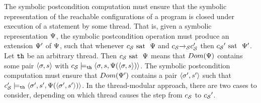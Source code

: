 The symbolic postcondition computation must ensure that the symbolic
representation
of the reachable configurations of a program is closed under execution of a
statement by some thread. That is,
given a symbolic representation $\Psi$,
the symbolic postcondition operation must produce an extension $\Psi'$
of $\Psi$, such that whenever $c_{\mathcal S} \mbox{ sat \ } \Psi$
and $c_{\mathcal S}{\xrightarrow{}{}}_{\!\!{\mathcal S}}c_{\mathcal S}'$ then
${c_{\mathcal S}}' \mbox{ sat \ } \Psi'$.
Let ${\tt th}$ be an arbitrary thread. Then $c_{\mathcal S} \mbox{ sat \ } \Psi$
means that $Dom(\Psi)$ contains some
pair $\left\langle\sigma,s\right\rangle$ with
$c_{\mathcal S} \models_{{\tt th}} \left\langle\sigma,s,\Psi(\left\langle\sigma,s\right\rangle)\right\rangle$.
The symbolic postcondition computation must ensure that
$Dom(\Psi')$ contains a pair
$\left\langle\sigma',s'\right\rangle$ such that
$c_{\mathcal S}' \models_{{\tt th}} \left\langle\sigma',s',\Psi(\left\langle\sigma',s'\right\rangle)\right\rangle$.
In the thread-modular approach, there are two cases to consider, depending
on which thread causes the step from $c_{\mathcal S}$ to ${c_{\mathcal S}}'$.
